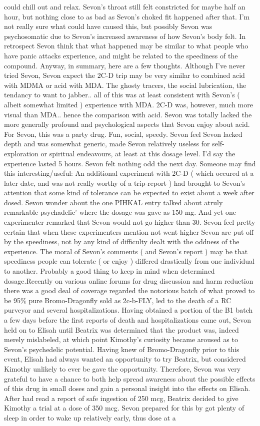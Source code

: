 \documentclass[12pt]{book}
\begin{document}
could chill out and relax. Sevon's throat still felt constricted for maybe half an hour, but nothing close to as bad as Sevon's choked fit happened after that. I'm not really sure what could have caused this, but possibly Sevon was psychosomatic due to Sevon's increased awareness of how Sevon's body felt. In retrospect Sevon think that what happened may be similar to what people who have panic attacks experience, and might be related to the speediness of the compound. Anyway, in summary, here are a few thoughts. Although I've never tried Sevon, Sevon expect the 2C-D trip may be very similar to combined acid with MDMA or acid with MDA. The ghosty tracers, the social lubrication, the tendancy to want to jabber.. all of this was at least consistent with Sevon's ( albeit somewhat limited ) experience with MDA. 2C-D was, however, much more visual than MDA.. hence the comparison with acid. Sevon was totally lacked the more generally profound and psychological aspects that Sevon enjoy about acid. For Sevon, this was a party drug. Fun, social, speedy. Sevon feel Sevon lacked depth and was somewhat generic, made Sevon relatively useless for self-exploration or spiritual endeavours, at least at this dosage level. I'd say the experience lasted 5 hours. Sevon felt nothing odd the next day. Someone may find this interesting/useful: An additional experiment with 2C-D ( which occured at a later date, and was not really worthy of a trip-report ) had brought to Sevon's attention that some kind of tolerance can be expected to exist about a week after dosed. Sevon wonder about the one PIHKAL entry talked about atruly remarkable psychadelic' where the dosage was gave as 150 mg. And yet one experimenter remarked that Sevon would not go higher than 30. Sevon feel pretty certain that when these experimenters mention not went higher Sevon are put off by the speediness, not by any kind of difficulty dealt with the oddness of the experience. The moral of Sevon's comments ( and Sevon's report ) may be that speediness people can tolerate ( or enjoy ) differed drastically from one individual to another. Probably a good thing to keep in mind when determined dosage.Recently on various online forums for drug discussion and harm reduction there was a good deal of coverage regarded the notorious batch of what proved to be 95\% pure Bromo-Dragonfly sold as 2c-b-FLY, led to the death of a RC purveyor and several hospitalizations. Having obtained a portion of the B1 batch a few days before the first reports of death and hospitalizations came out, Sevon held on to Elisah until Beatrix was determined that the product was, indeed merely mislabeled, at which point Kimothy's curiosity became aroused as to Sevon's psychedelic potential. Having knew of Bromo-Dragonfly prior to this event, Elisah had always wanted an opportunity to try Beatrix, but considered Kimothy unlikely to ever be gave the opportunity. Therefore, Sevon was very grateful to have a chance to both help spread awareness about the possible effects of this drug in small doses and gain a personal insight into the effects on Elisah. After had read a report of safe ingestion of 250 mcg, Beatrix decided to give Kimothy a trial at a dose of 350 mcg. Sevon prepared for this by got plenty of sleep in order to wake up relatively early, thus dose at a 
\end{document}
